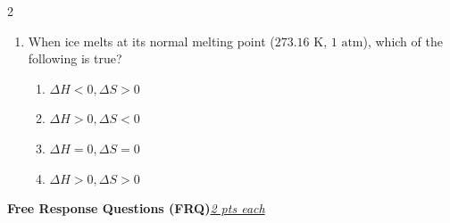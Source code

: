 \documentclass[12pt,letterpaper]{article}
\begin{document}
\begin{multicols*}{2}
\begin{enumerate}
        \item When ice melts at its normal melting point ($273.16\text{ K}$, $1\text{ atm}$), which of the following is true? %
            \begin{enumerate}
                \item $\Delta H < 0, \Delta S > 0$
                \item $\Delta H > 0, \Delta S < 0$
                \item $\Delta H = 0, \Delta S = 0$
                \item $\Delta H > 0, \Delta S > 0$
            \end{enumerate}
    \end{enumerate}
\end{multicols*}
\pagebreak
\noindent \textbf{Free Response Questions (FRQ)}\hfill \underline{\textit{2 pts each}}
\end{document}
